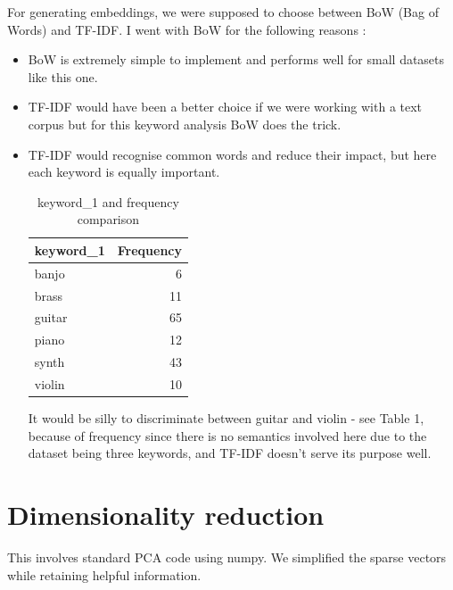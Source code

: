 \documentclass{article}
\begin{document}
For generating embeddings, we were supposed to choose between BoW (Bag of Words) and TF-IDF. I went with BoW for the following reasons :
\begin{itemize}
\item BoW is extremely simple to implement and performs well for small datasets like this one.
\item TF-IDF would have been a better choice if we were working with a text corpus but for this keyword analysis BoW does the trick.
\item TF-IDF would recognise common words and reduce their impact, but here each keyword is equally important.

\begin{table}
\centering
\begin{tabular}{l|r}
keyword\_1 & Frequency \\\hline
banjo & 6 \\
brass & 11 \\
guitar & 65 \\
piano & 12 \\
synth & 43 \\
violin & 10
\end{tabular}
\caption{\label{tab:widgets} keyword\_1 and frequency comparison}
\end{table}

It would be silly to discriminate between guitar and violin - see Table 1, because of frequency since there is no semantics involved here due to the dataset being three keywords, and TF-IDF doesn't serve its purpose well.
\end{itemize}


\section{Dimensionality reduction}
This involves standard PCA code using numpy. We simplified the sparse vectors while retaining helpful information.
\end{document}
